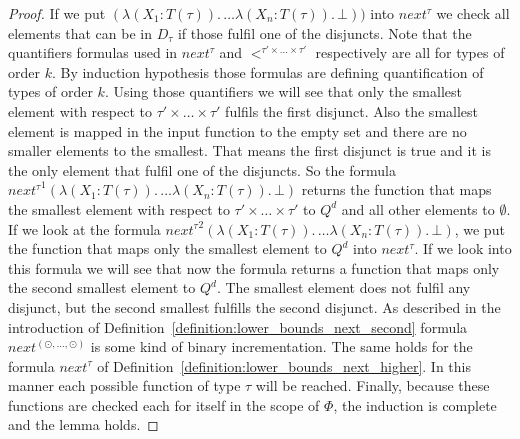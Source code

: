 \begin{proof}
    If we put $(\lambda (X_1 \colon T(\tau)).\, \dots \lambda (X_n \colon T(\tau)).\,\bot))$ into $next^{\tau}$ we check all elements that can be in $D_{\tau}$ if those fulfil one of 
    the disjuncts. Note that the quantifiers formulas used in $next^\tau$ and $<^{\tau'\times\dots\times\tau'}$ respectively are all for types of order $k$. By induction hypothesis those formulas are defining quantification of types of order $k$. Using those quantifiers we will see that only the smallest element with respect to $\tau'\times\dots\times\tau'$ fulfils the first disjunct. Also the 
    smallest element is mapped in the input function to the empty set and there are no smaller elements to the smallest. 
    That means the first disjunct is true and it is the only element that fulfil one of the disjuncts. So the 
    formula ${next^{\tau}}^1 (\lambda (X_1 \colon T(\tau)).\, \dots \lambda (X_n \colon T(\tau)).\,\bot)$ returns the function that maps the smallest element with respect to $\tau'\times\dots\times\tau'$ to $Q^d$ and all other elements to $\emptyset$. If we look at the formula $
    {next^{\tau}}^2 (\lambda (X_1 \colon T(\tau)).\, \dots \lambda (X_n \colon T(\tau)).\,\bot)$, we put the function that maps only the smallest element to $Q^d$ into 
    $next^{\tau}$. If we look into this formula we will see that now the formula 
    returns a function that maps only the second smallest element to $Q^d$. The smallest element does not 
    fulfil any disjunct, but the second smallest fulfills the second disjunct. As described in the 
    introduction of Definition~\ref{definition:lower_bounds_next_second} formula $next^{(\odot, 
    \dots, \odot)}$ is some kind of binary incrementation. The same holds for the formula $next^\tau$ of Definition~\ref{definition:lower_bounds_next_higher}. In this manner each possible function of 
    type $\tau$ will be reached. Finally, because these functions are checked each for 
    itself in the scope of $\Phi$, the induction is complete and the lemma holds.
\end{proof}